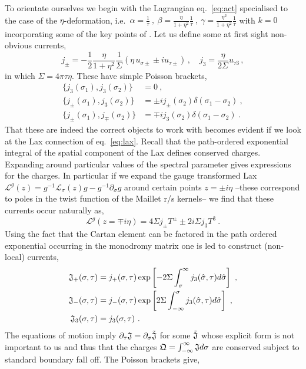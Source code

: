 \documentclass[12pt]{article}
\def\Lax{{\mathscr L}}
\def\ee{\boldsymbol{e}}
\def\be{\begin{equation}}
\def\ee{\end{equation}}
\begin{document}
To orientate ourselves we begin with the Lagrangian  eq.~\eqref{eq:act}  specialised to the case of the $\eta$-deformation, i.e.\ $ \alpha = \frac{1}{\tau} \ , \ \beta = \frac{\eta}{1+\eta^2} \frac{1}{\tau}  \ , \ \gamma =   \frac{\eta^2}{1+\eta^2} \frac{1}{\tau}$ with $k=0$ incorporating some of the key points of \cite{Kawaguchi:2012ve,Delduc:2013fga}. Let us define some at first sight non-obvious currents,
\be
j_\pm = -\frac{1}{2} \frac{\eta}{1+\eta^2} \frac{1}{\Sigma} \left(\eta\, u_{\sigma\pm } \pm i u_{\tau \pm }  \right) \,, \quad j_3= \frac{\eta}{2\Sigma} u_{\tau 3}   \, , 
\ee
in which $\Sigma = 4 \pi \tau \eta$.  These have simple Poisson brackets,
\be
\begin{aligned}
\{ j_3 (\sigma_1) , j_3(\sigma_2) \} &=  0  \ , \\
\{ j_\pm (\sigma_1) , j_3(\sigma_2) \} &= \pm i j_\pm (\sigma_2) \delta(\sigma_1- \sigma_2) \ ,  \\ 
\{ j_\pm (\sigma_1) , j_\mp(\sigma_2) \} &= \mp i  j_3(\sigma_2) \delta(\sigma_1- \sigma_2)  \ . 
 \end{aligned}
\ee
That these are indeed the correct objects to work with becomes evident if we look at the Lax connection of eq.~\eqref{eq:lax}.  Recall that the path-ordered exponential integral of the spatial component of the Lax defines conserved charges.  Expanding around particular values of the spectral parameter gives expressions for the charges.  In particular if we expand the gauge transformed Lax $\Lax^g(z) = g^{-1}  \Lax_\sigma(z) g - g^{-1} \partial_\sigma g$ around certain points $z= \pm i \eta$ --these correspond to poles in the twist function of the Maillet r/s kernels-- we find  that these currents occur naturally as, 
\be
\Lax^g(z=\mp i \eta)   = 4\Sigma j_\pm T^\pm \pm 2 i \Sigma j_3 T^3 \ .
\ee
Using the fact that the Cartan element can be factored in the path ordered exponential occurring in the monodromy matrix \cite{Kawaguchi:2012gp} one is led to construct  (non-local) currents,
\be
\begin{aligned}
\frak{J}_+(\sigma ,\tau) &= j_+(\sigma ,\tau) \exp\left[- 2 \Sigma \int_{\sigma}^\infty  j_3 (\hat{\sigma}  ,\tau)  d\hat{\sigma}  \right] \ , \\  
\frak{J}_-(\sigma ,\tau) &= j_-(\sigma ,\tau) \exp\left[ 2 \Sigma \int_{-\infty}^\sigma  j_3 (\hat{\sigma}  ,\tau)  d\hat{\sigma}  \right] \ , \\  
\frak{J}_3(\sigma ,\tau) &= j_3(\sigma ,\tau) \ . 
 \end{aligned}
\ee 
The equations of motion imply $\partial_\tau \frak{J} = \partial_\sigma \tilde{ \frak{J}}$ for some $\tilde{ \frak{J}}$ whose explicit form is not important to us and thus that the charges $\frak{Q} = \int_{-\infty}^\infty \frak{J} d\sigma$   are conserved subject to standard boundary fall off.  The Poisson brackets give,
\end{document}
